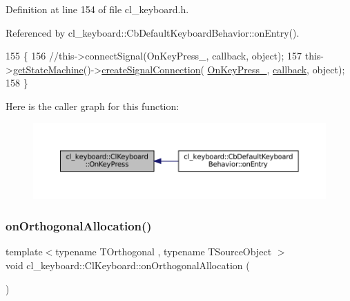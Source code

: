 Definition at line 154 of file cl\+\_\+keyboard.\+h.



Referenced by cl\+\_\+keyboard\+::\+Cb\+Default\+Keyboard\+Behavior\+::on\+Entry().


\begin{DoxyCode}
155         \{
156                 \textcolor{comment}{//this->connectSignal(OnKeyPress\_, callback, object);}
157                 this->\hyperlink{classsmacc_1_1ISmaccClient_aec51d4712404cb9882b86e4c854bb93a}{getStateMachine}()->\hyperlink{classsmacc_1_1ISmaccStateMachine_adf0f42ade0c65cc471960fe2a7c42da2}{createSignalConnection}(
      \hyperlink{classcl__keyboard_1_1ClKeyboard_ae7fb61a86ed9cdd313f0cc1b2661c63c}{OnKeyPress\_}, \hyperlink{sm__ridgeback__barrel__search__1_2servers_2opencv__perception__node_2opencv__perception__node_8cpp_a050e697bd654facce10ea3f6549669b3}{callback}, \textcolor{keywordtype}{object});
158         \}
\end{DoxyCode}
Here is the caller graph for this function\+:
\nopagebreak
\begin{figure}[H]
\begin{center}
\leavevmode
\includegraphics[width=350pt]{classcl__keyboard_1_1ClKeyboard_ae9f4a6dc1ce18397394a432826970baa_icgraph}
\end{center}
\end{figure}
\mbox{\label{classcl__keyboard_1_1ClKeyboard_a9eed69eeb6e9d2ae0e166ccebad1557e}} 
\subsubsection{\texorpdfstring{on\+Orthogonal\+Allocation()}{onOrthogonalAllocation()}}
{\footnotesize\ttfamily template$<$typename T\+Orthogonal , typename T\+Source\+Object $>$ \\
void cl\+\_\+keyboard\+::\+Cl\+Keyboard\+::on\+Orthogonal\+Allocation (\begin{DoxyParamCaption}{ }\end{DoxyParamCaption})\hspace{0.3cm}{\ttfamily [inline]}}




